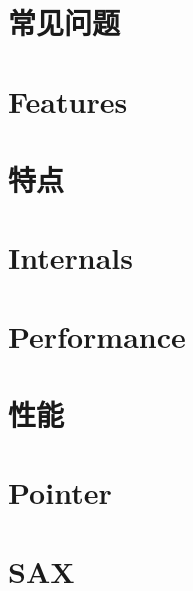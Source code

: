 \documentclass[twoside]{book}
\newcommand{\+}{\discretionary{\mbox{\scriptsize$\hookleftarrow$}}{}{}}
\begin{document}
\chapter{常见问题}
\label{md_Commun_Externe_RapidJSON_doc_faq.zh-cn}
\hypertarget{md_Commun_Externe_RapidJSON_doc_faq.zh-cn}{}

\chapter{Features}
\label{md_Commun_Externe_RapidJSON_doc_features}
\hypertarget{md_Commun_Externe_RapidJSON_doc_features}{}

\chapter{特点}
\label{md_Commun_Externe_RapidJSON_doc_features.zh-cn}
\hypertarget{md_Commun_Externe_RapidJSON_doc_features.zh-cn}{}

\chapter{Internals}
\label{md_Commun_Externe_RapidJSON_doc_internals}
\hypertarget{md_Commun_Externe_RapidJSON_doc_internals}{}

\chapter{Performance}
\label{md_Commun_Externe_RapidJSON_doc_performance}
\hypertarget{md_Commun_Externe_RapidJSON_doc_performance}{}

\chapter{性能}
\label{md_Commun_Externe_RapidJSON_doc_performance.zh-cn}
\hypertarget{md_Commun_Externe_RapidJSON_doc_performance.zh-cn}{}

\chapter{Pointer}
\label{md_Commun_Externe_RapidJSON_doc_pointer}
\hypertarget{md_Commun_Externe_RapidJSON_doc_pointer}{}

\chapter{S\+AX}
\label{md_Commun_Externe_RapidJSON_doc_sax}
\hypertarget{md_Commun_Externe_RapidJSON_doc_sax}{}

\end{document}

